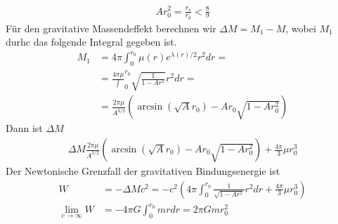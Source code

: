 \documentclass[a4paper]{article}
\begin{document}
\begin{align}
    Ar_0^2 = \frac{r_s}{r_0} < \frac{8}{9}
\end{align}
Für den gravitative Massendeffekt berechnen wir $\Delta M= M_1 -M$, wobei
$M_1$ durhc das folgende Integral gegeben ist.
\begin{align}
    M_1 &= 4\pi \int _0^{r_0}\mu(r) e^{\lambda(r)/2}r^2 dr =\\
    &= \frac{4\pi\mu} \int_0^{r_0} \sqrt{\frac{1}{1-Ar^2}} r^2 dr= \\
    &= \frac{2\pi\mu}{A^{3/2}} (\arcsin(\sqrt{A}r_0) -Ar_0\sqrt{1-Ar_0^2})
\end{align}
Dann ist $\Delta M$
\begin{align}
    \Delta M \frac{2\pi\mu}{A^{3/2}} (\arcsin(\sqrt{A}r_0)
    -Ar_0\sqrt{1-Ar_0^2})  + \frac{4\pi}{3} \mu r_0^3
\end{align}
Der Newtonische Grenzfall der gravitativen Bindungsenergie ist
\begin{align}
    W &= -\Delta M c^2 = -c^2(4\pi\int _0^{r_0} \frac{1}{\sqrt{1-Ar^2}} r^2
    dr + \frac{4\pi}{3} \mu r^3_0) \\
    \lim_{c\rightarrow \infty} W &= -4\pi G \int_0^{r_0} m rdr
    = 2\pi Gmr_0^2
\end{align}






\nocite{meinel}
\nocite{piotr}
\nocite{oloff}
\printbibliography
\end{document}
